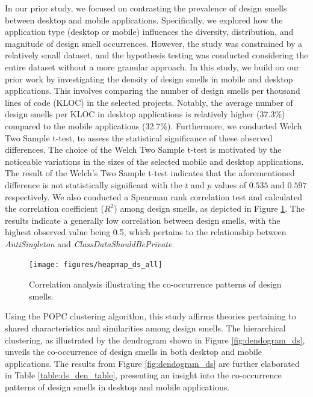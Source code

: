 \documentclass[AMA,Times1COL]{WileyNJDv5} %
\begin{document}
	In our prior study\cite{ogenrwot}, we focused on contrasting the prevalence of design smells between desktop and mobile applications. Specifically, we explored how the application type (desktop or mobile) influences the diversity, distribution, and magnitude of design smell occurrences. However, the study was constrained by a relatively small dataset, and the hypothesis testing was conducted considering the entire dataset without a more granular approach. In this study, we build on our prior work by investigating the density of design smells in mobile and desktop applications. This involves comparing the number of design smells per thousand lines of code (KLOC) in the selected projects. Notably, the average number of design smells per KLOC in desktop applications is relatively higher (37.3\%) compared to the mobile applications (32.7\%). Furthermore, we conducted Welch Two Sample t-test, to assess the statistical significance of these observed differences. The choice of the Welch Two Sample t-test is motivated by the noticeable variations in the sizes of the selected mobile and desktop applications. The result of the Welch's Two Sample t-test indicates that the aforementioned difference is not statistically significant  with the $t$ and $p$ values of $0.535$ and $0.597$ respectively. We also conducted a Spearman rank correlation test and calculated the correlation coefficient ($R^2$) among design smells, as depicted in Figure \ref{fig:headmapdsall}. The results indicate a generally low correlation between design smells, with the highest observed value being 0.5, which pertains to the relationship between \textit{AntiSingleton} and \textit{ClassDataShouldBePrivate}.
	\begin{figure}[!h]
	\centerline{\texttt{[image: figures/heapmap\_ds\_all]}}
	\caption{Correlation analysis illustrating the co-occurrence patterns of design smells.\label{fig:headmapdsall}}
	\end{figure}
	Using the POPC clustering algorithm, this study affirms theories pertaining to shared characteristics and similarities among design smells. The hierarchical clustering, as illustrated by the dendrogram shown in Figure \ref{fig:dendogram_ds}, unveils the co-occurrence of design smells in both desktop and mobile applications. The results from Figure \ref{fig:dendogram_ds} are further elaborated in Table \ref{table:ds_den_table}, presenting an insight into the co-occurrence patterns of design smells in desktop and mobile applications.
	
\end{document}
